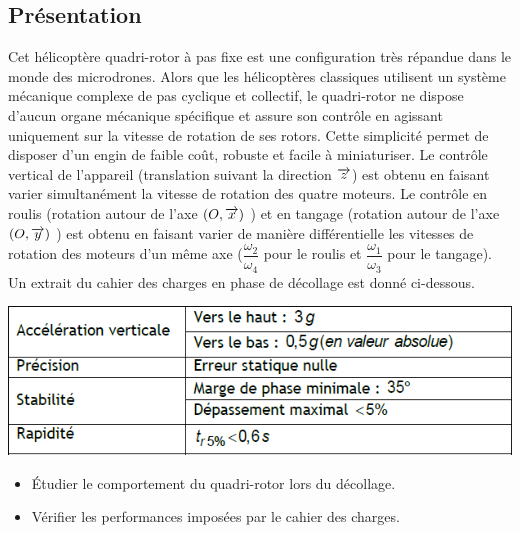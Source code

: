 \documentclass[10pt,fleqn]{article} %
\begin{document}

\vspace{8cm}
\pagestyle{fancy}
\thispagestyle{plain}

\def\columnseprulecolor{\color{ocre}}
\setlength{\columnseprule}{0.4pt} 

\def\pathfig{images}

\begin{multicols}{2}
\section*{Présentation}
Cet hélicoptère quadri-rotor à pas fixe est une configuration très répandue dans le monde des microdrones.
Alors que les hélicoptères classiques utilisent un système mécanique complexe de pas cyclique et
collectif, le quadri-rotor ne dispose d'aucun organe mécanique spécifique et assure son contrôle en agissant
uniquement sur la vitesse de rotation de ses rotors. Cette simplicité permet de disposer d'un engin de faible
coût, robuste et facile à miniaturiser.
Le contrôle vertical de l'appareil (translation suivant la direction $\overrightarrow{z}$) est obtenu en faisant varier
simultanément la vitesse de rotation des quatre moteurs. Le contrôle en roulis (rotation autour de l’axe $(O,\overrightarrow{x})$ ) et en tangage (rotation autour de l’axe $(O,\overrightarrow{y})$ ) est obtenu en faisant varier de manière différentielle
les vitesses de rotation des moteurs d'un même axe ($\dfrac{\omega_2}{\omega_4}$  pour le roulis et $\dfrac{\omega_1}{\omega_3}$ pour le tangage).
Un extrait du cahier des charges en phase de décollage est donné ci-dessous.


\begin{center}
\includegraphics[width=\linewidth]{images/fig_02}
\end{center}

\begin{obj}
\begin{itemize}
\item Étudier le comportement du quadri-rotor lors du décollage.
\item Vérifier les performances imposées par le cahier des charges.
\end{itemize}
\end{obj}


\end{multicols}
\end{document}
